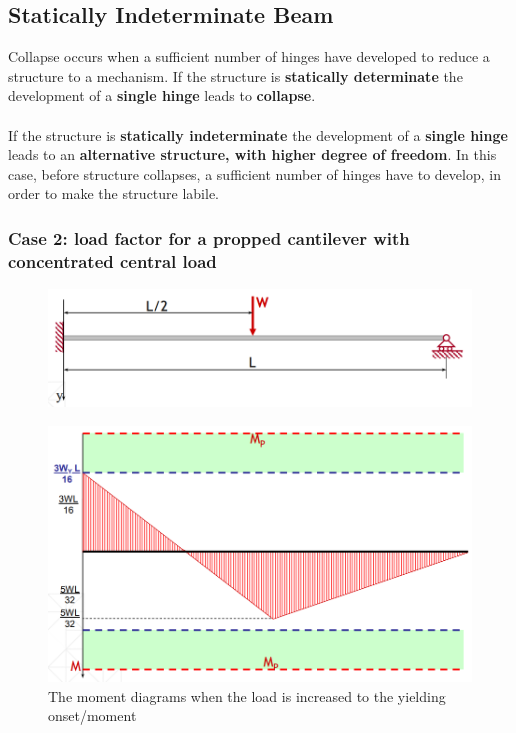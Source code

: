\documentclass[class=report, crop=false, 12pt,a4paper]{standalone}
\begin{document}
\subsection{Statically Indeterminate Beam}
Collapse occurs when a sufficient number of hinges have developed to reduce a structure to a mechanism. If the structure is \textbf{statically determinate} the development of a \textbf{single hinge} leads to \textbf{collapse}. \\\\
If the structure is \textbf{statically indeterminate} the development of a \textbf{single hinge} leads to an \textbf{alternative structure, with higher degree of freedom}. In this case, before structure collapses, a sufficient number of hinges have to develop, in order to make the structure labile.
\subsubsection{\large Case 2: load factor for a propped cantilever with concentrated central load}
\begin{figure}[H]
  \centering
  \includegraphics[width = 0.8 \textwidth]{../img/beam27.PNG}
\end{figure}
\begin{figure}[H]
  \centering
  \includegraphics[width = 0.9 \textwidth]{../img/beam28.PNG}
  \caption{The moment diagrams when the load is increased to the yielding onset/moment}
\end{figure}
\end{document}
